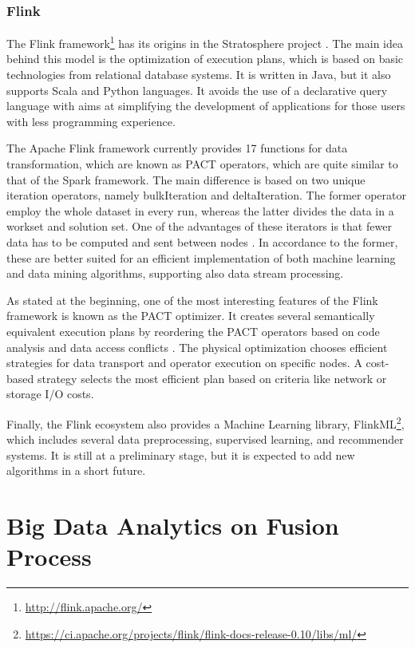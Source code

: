\documentclass[3p,review]{elsarticle}
\begin{document}
\subsubsection{Flink}\label{subsec:flink}

The Flink framework\footnote{\url{http://flink.apache.org/}} has its origins in the Stratosphere project \cite{Alexandrov14,Hues12}. The main idea behind this model is the optimization of execution plans, which is based on basic technologies from relational database systems. It is written in Java, but it also supports Scala and Python languages. It avoids the use of a declarative query language with aims at simplifying the development of applications for those users with less programming experience.

The Apache Flink framework currently provides 17 functions for data transformation, which are known as PACT operators, which are quite similar to that of the Spark framework. The main difference is based on two unique iteration operators, namely bulkIteration and deltaIteration. The former operator employ the whole dataset in every run, whereas the latter divides the data in a workset and solution set. One of the advantages of these iterators is that fewer data has to be computed and sent between nodes  \cite{EwenTKM12}. In accordance to the former, these are better suited for an efficient implementation of both machine learning and data mining algorithms, supporting also data stream processing.

As stated at the beginning, one of the most interesting features of the Flink framework is known as the PACT optimizer. It creates several semantically equivalent execution plans by reordering the PACT operators based on code analysis and data access conflicts \cite{Alexandrov14,Hues12}. The physical optimization chooses efficient strategies for data transport and operator execution on specific nodes. A cost-based strategy selects the most efficient plan based on criteria like network or storage I/O costs.

Finally, the Flink ecosystem also provides a Machine Learning library, FlinkML\footnote{\url{https://ci.apache.org/projects/flink/flink-docs-release-0.10/libs/ml/}}, which includes several data preprocessing, supervised learning, and recommender systems. It is still at a preliminary stage, but it is expected to add new algorithms in a short future.

\section{Big Data Analytics on Fusion Process}\label{sec:fusion}
\end{document}
